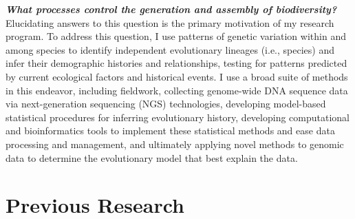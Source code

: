 \textbf{\textit{What processes control the generation and assembly of
        biodiversity?}}
Elucidating answers to this question is the primary motivation of my research
program.
To address this question, I use patterns of genetic variation within and among
species to identify independent evolutionary lineages (i.e., species) and infer
their demographic histories and relationships, testing for patterns predicted
by current ecological factors and historical events.
I use a broad suite of methods in this endeavor, including
fieldwork,
collecting genome-wide DNA sequence data via next-generation sequencing (NGS)
technologies,
developing model-based statistical procedures for inferring evolutionary
history,
developing computational and bioinformatics tools to implement these
statistical methods and ease data processing and management,
and ultimately applying novel methods to genomic data to determine the
evolutionary model that best explain the data.

\section*{Previous Research}

